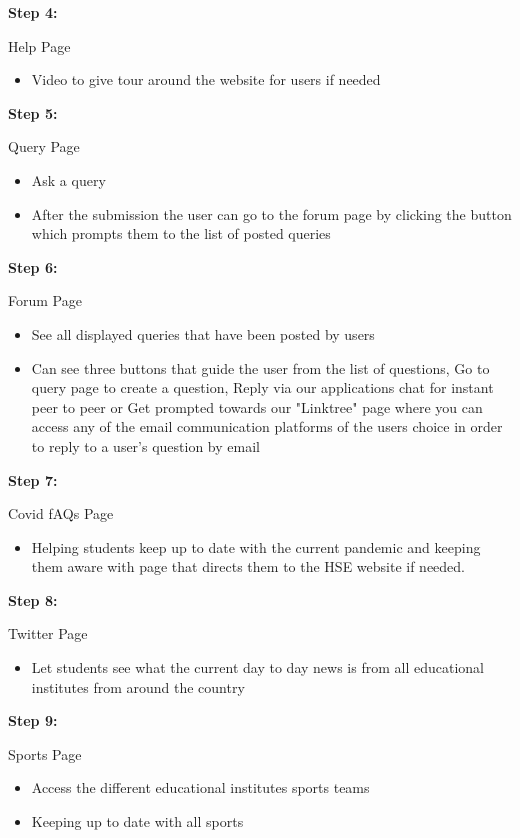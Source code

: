 \textbf{Step 4:}\hfill \break

 Help Page
\begin{itemize}
  \item Video to give tour around the website for users if needed
\end{itemize}


\textbf{Step 5:}\hfill \break

Query Page
\begin{itemize}
  \item Ask a query
  \item After the submission the user can go to the forum page by clicking the button which prompts them to the list of posted queries
\end{itemize}


\textbf{Step 6:}\hfill \break

Forum Page
\begin{itemize}
  \item See all displayed queries that have been posted by users
  \item Can see three buttons that guide the user from the list of questions, Go to query page to create a question, Reply via our applications chat for instant peer to peer or Get prompted towards our "Linktree"\cite{ref30} page where you can access any of the email communication platforms of the users choice in order to reply to a user’s question by email
\end{itemize}
  

\textbf{Step 7:}	\hfill \break

Covid fAQs Page

\begin{itemize}
  \item Helping students keep up to date with the current pandemic and keeping them aware with page that directs them to the HSE website if needed.
\end{itemize}


\textbf{Step 8:}	\hfill \break

Twitter Page

\begin{itemize}
  \item Let students see what the current day to day news is from all educational institutes from around the country
\end{itemize}


\textbf{Step 9:} \hfill \break

Sports Page

\begin{itemize}
  \item Access the different educational institutes sports teams 
  \item Keeping up to date with all sports
\end{itemize}




